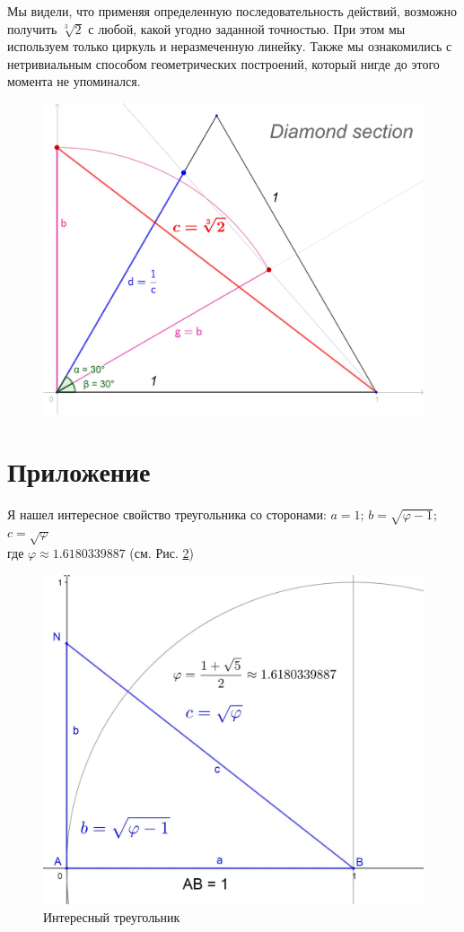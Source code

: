 \documentclass[12pt, letterpaper, oneside]{report}
\begin{document}
Мы видели, что применяя определенную последовательность действий, возможно получить $\sqrt[3]{2}$ с любой, какой угодно заданной точностью. При этом мы используем только циркуль и неразмеченную линейку. Также мы ознакомились с  нетривиальным способом геометрических построений, который нигде до этого момента не упоминался.\\



\begin{figure}[h]
	\centering
	\includegraphics[width=0.6\linewidth]{images/ds_def.jpg}
	
	\label{fig:Diamond Section}
\end{figure}

\newpage

\section{Приложение}

Я нашел интересное свойство треугольника со сторонами: $a=1$; $b=\sqrt{\varphi-1}$; $c=\sqrt{\varphi}$\\
где $\varphi\approx 1.6180339887$ (см. Рис. \ref{fig:mytriangle})
\begin{figure}[h]
	\centering
	\includegraphics[width=0.7\linewidth]{images/my_triangle.jpg}
	\caption{Интересный треугольник}
	\label{fig:mytriangle}
\end{figure}
\end{document}
